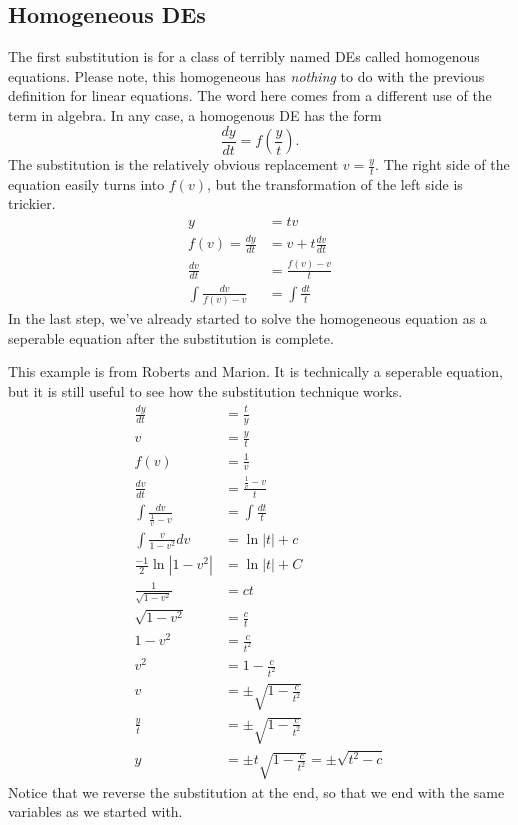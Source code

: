 \documentclass[fleqn,letterpaper]{report}
\begin{document}
\subsection{Homogeneous DEs}
\label{homogeneous}

The first substitution is for a class of terribly named DEs
called homogenous equations. Please note, this homogeneous has
\emph{nothing} to do with the previous definition for linear
equations. The word here comes from a different use of the
term in algebra. In any case, a homogenous DE has the form
\begin{equation*}
\frac{dy}{dt} = f \left( \frac{y}{t} \right).
\end{equation*}
The substitution is the relatively obvious replacement $v =
\frac{y}{t}$. The right side of the equation easily turns
into $f(v)$, but the transformation of the left side is
trickier. 
\begin{align*}
y & = tv \\
f(v) = \frac{dy}{dt} & = v + t \frac{dv}{dt} \\
\frac{dv}{dt} & = \frac{f(v) - v}{t} \\
\int \frac{dv}{f(v)-v} & = \int \frac{dt}{t}
\end{align*}
In the last step, we've already started to solve the
homogeneous equation as a seperable equation after the
substitution is complete. 

\begin{example}
This example is from Roberts and Marion. It is technically a
seperable equation, but it is still useful to see how the
substitution technique works.
\begin{align*}
\frac{dy}{dt} & = \frac{t}{y} \\
v & =\frac{y}{t} \\
 f(v) & = \frac{1}{v} \\
\frac{dv}{dt} & = \frac{\frac{1}{v} - v}{t} \\
\int \frac{dv}{\frac{1}{v} -v} & = \int \frac{dt}{t} \\
\int \frac{v}{1-v^2} dv & = \ln |t| + c \\
\frac{-1}{2} \ln |1-v^2| & = \ln |t| + C \\
\frac{1}{\sqrt{1-v^2}} & = ct \\
\sqrt{1-v^2} & = \frac{c}{t} \\
1-v^2 & = \frac{c}{t^2} \\
v^2 & = 1 - \frac{c}{t^2} \\
v & = \pm \sqrt{ 1 - \frac{c}{t^2}} \\
\frac{y}{t} & = \pm \sqrt{ 1 - \frac{c}{t^2}} \\
y & = \pm t \sqrt{1 - \frac{c}{t^2}} = \pm \sqrt{t^2 - c}
\end{align*}
Notice that we reverse the substitution at the end, so that we end
with the same variables as we started with. 
\end{example}
\end{document}
